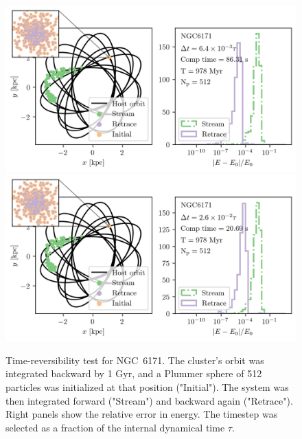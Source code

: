         \begin{figure}
            \centering
            \includegraphics[width=\linewidth]{images/NumericalErrorStreamRetrace_NGC6171_Nsteps_524288_stepsPerTau_155.png}
            \includegraphics[width=\linewidth]{images/NumericalErrorStreamRetrace_NGC6171_Nsteps_131072_stepsPerTau_38.png}
            \caption{Time-reversibility test for NGC~6171. The cluster's orbit was integrated backward by 1 Gyr, and a Plummer sphere of 512 particles was initialized at that position ("Initial"). The system was then integrated forward ("Stream") and backward again ("Retrace"). Right panels show the relative error in energy. The timestep was selected as a fraction of the internal dynamical time $\tau$.}
            \label{fig:NumericalErrorStreamRetrace_NGC6171_Nsteps_524288_stepsPerTau_155}
        \end{figure}

